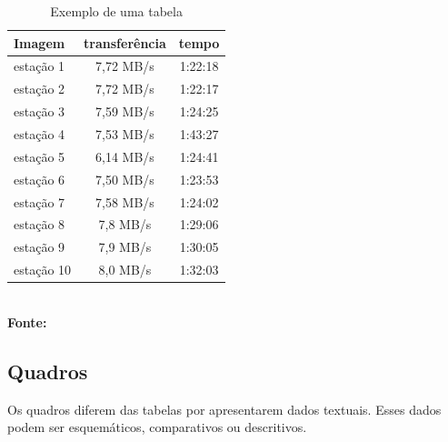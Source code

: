 \begin{table}[htb]
	\centering
	\caption{\hspace{0.1cm} Exemplo de uma tabela}
	\vspace{-0.3cm} %
	\label{tab:tabela1}
	\begin{tabular}{l|c|c}
		\hline
		\textbf{Imagem} & \textbf{transferência} & \textbf{tempo} \\
		\hline
		estação 1       & 7,72 MB/s              & 1:22:18        \\
		estação 2       & 7,72 MB/s              & 1:22:17        \\
		estação 3       & 7,59 MB/s              & 1:24:25        \\
		estação 4       & 7,53 MB/s              & 1:43:27        \\
		estação 5       & 6,14 MB/s              & 1:24:41        \\
		estação 6       & 7,50 MB/s              & 1:23:53        \\
		estação 7       & 7,58 MB/s              & 1:24:02        \\
		estação 8       & 7,8 MB/s               & 1:29:06        \\
		estação 9       & 7,9 MB/s               & 1:30:05        \\
		estação 10      & 8,0 MB/s               & 1:32:03        \\
		\hline
	\end{tabular}
	\vspace{.1cm}  %
	\small
	{\footnotesize\\ \textbf{Fonte: \cite{monog-fabio}}}
\end{table}

\subsection{\esp Quadros}

Os quadros diferem das tabelas por apresentarem dados textuais.
Esses dados podem ser esquemáticos, comparativos ou descritivos.

